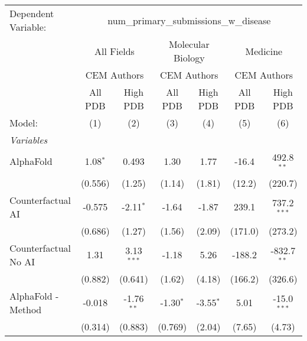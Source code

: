 \begingroup
\centering
\begin{tabular}{lcccccc}
   \tabularnewline \midrule \midrule
   Dependent Variable: & \multicolumn{6}{c}{num\_primary\_submissions\_w\_disease}\\
 & \multicolumn{2}{c}{All Fields} & \multicolumn{2}{c}{Molecular Biology} & \multicolumn{2}{c}{Medicine} \\
\cmidrule(lr){2-3} \cmidrule(lr){4-5} \cmidrule(lr){6-7}
 & \multicolumn{2}{c}{CEM Authors} & \multicolumn{2}{c}{CEM Authors} & \multicolumn{2}{c}{CEM Authors} \\
\cmidrule(lr){2-3} \cmidrule(lr){4-5} \cmidrule(lr){6-7}
 & \multicolumn{1}{c}{All PDB} & \multicolumn{1}{c}{High PDB} & \multicolumn{1}{c}{All PDB} & \multicolumn{1}{c}{High PDB} & \multicolumn{1}{c}{All PDB} & \multicolumn{1}{c}{High PDB} \\
\cmidrule(lr){2-2} \cmidrule(lr){3-3} \cmidrule(lr){4-4} \cmidrule(lr){5-5} \cmidrule(lr){6-6} \cmidrule(lr){7-7}
   Model:                                                     & (1)           & (2)          & (3)          & (4)         & (5)     & (6)\\  
   \midrule
   \emph{Variables}\\
   AlphaFold                                                  & 1.08$^{*}$    & 0.493        & 1.30         & 1.77        & -16.4   & 492.8$^{**}$\\   
                                                              & (0.556)       & (1.25)       & (1.14)       & (1.81)      & (12.2)  & (220.7)\\   
   Counterfactual AI                                          & -0.575        & -2.11$^{*}$  & -1.64        & -1.87       & 239.1   & 737.2$^{***}$\\   
                                                              & (0.686)       & (1.27)       & (1.56)       & (2.09)      & (171.0) & (273.2)\\   
   Counterfactual No AI                                       & 1.31          & 3.13$^{***}$ & -1.18        & 5.26        & -188.2  & -832.7$^{**}$\\   
                                                              & (0.882)       & (0.641)      & (1.62)       & (4.18)      & (166.2) & (326.6)\\   
   AlphaFold - Method                                         & -0.018        & -1.76$^{**}$ & -1.30$^{*}$  & -3.55$^{*}$ & 5.01    & -15.0$^{***}$\\   
                                                              & (0.314)       & (0.883)      & (0.769)      & (2.04)      & (7.65)  & (4.73)\\   

\end{tabular}
